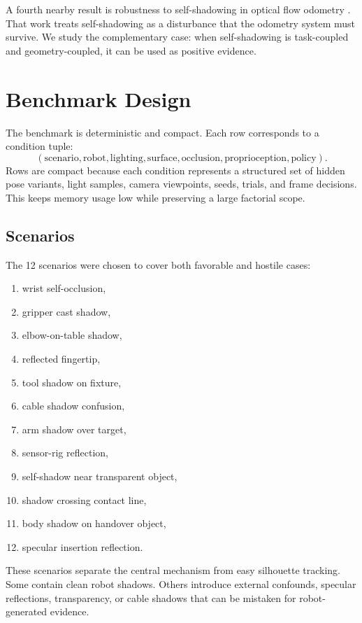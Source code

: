 \documentclass{article}
\begin{document}
A fourth nearby result is robustness to self-shadowing in optical flow odometry \cite{seegmiller2011optical}. That work treats self-shadowing as a disturbance that the odometry system must survive. We study the complementary case: when self-shadowing is task-coupled and geometry-coupled, it can be used as positive evidence.

\section{Benchmark Design}

The benchmark is deterministic and compact. Each row corresponds to a condition tuple:
\[
(\mathrm{scenario},\mathrm{robot},\mathrm{lighting},\mathrm{surface},\mathrm{occlusion},\mathrm{proprioception},\mathrm{policy}).
\]
Rows are compact because each condition represents a structured set of hidden pose variants, light samples, camera viewpoints, seeds, trials, and frame decisions. This keeps memory usage low while preserving a large factorial scope.

\begin{table}[t]
\centering
\small

\caption{Full-scale benchmark factors. Compact rows are deterministic condition summaries. Each row represents 17 seeds, 8 hidden pose variants, 6 light samples, 5 camera viewpoints, 30 trials, and 72 frames.}
\label{tab:scale}
\end{table}

\subsection{Scenarios}

The 12 scenarios were chosen to cover both favorable and hostile cases:
\begin{enumerate}[leftmargin=1.5em]
\item wrist self-occlusion,
\item gripper cast shadow,
\item elbow-on-table shadow,
\item reflected fingertip,
\item tool shadow on fixture,
\item cable shadow confusion,
\item arm shadow over target,
\item sensor-rig reflection,
\item self-shadow near transparent object,
\item shadow crossing contact line,
\item body shadow on handover object,
\item specular insertion reflection.
\end{enumerate}
These scenarios separate the central mechanism from easy silhouette tracking. Some contain clean robot shadows. Others introduce external confounds, specular reflections, transparency, or cable shadows that can be mistaken for robot-generated evidence.
\end{document}
